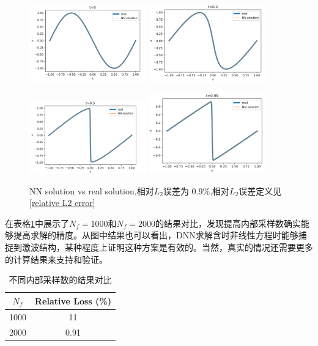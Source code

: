 \documentclass{article}
\begin{document}
\begin{figure}[ht]
 	 \centering
 	 \includegraphics[width=0.45\textwidth]{images/BG_t0.png}
 	 \includegraphics[width=0.45\textwidth]{images/BG_t1.png}

 	 \includegraphics[width=0.45\textwidth]{images/BG_t2.png}
 	 \includegraphics[width=0.45\textwidth]{images/BG_t3.png}
	 \caption {NN solution vs real solution,相对$L_2$误差为 $0.9\%$,相对$L_2$误差定义见\ref{relative L2 error}}
	 \label{BG}
\end{figure}
在表格\ref{Burgers结果对比}中展示了$N_f=1000$和$N_f=2000$的结果对比，发现提高内部采样数确实能够提高求解的精度。从图中结果也可以看出，DNN求解含时非线性方程时能够捕捉到激波结构，某种程度上证明这种方案是有效的。当然，真实的情况还需要更多的计算结果来支持和验证。
\begin{table}[ht]
\centering  
\caption{不同内部采样数的结果对比}
\label{Burgers结果对比}
\begin{tabular}{cc} 
	\toprule
	$N_f$ & Relative Loss (\%) \\
	\hline
	\hline
	1000 & 11  \\
	\hline
	2000 & 0.91 \\
	\bottomrule
\end{tabular}
\end{table}
\end{document}
